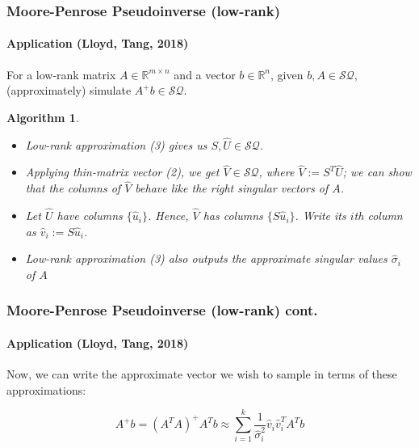 \documentclass{beamer}
\newcommand\0{\mathbf{0}}
\newcommand\RR{\mathbb{R}}
\newcommand\<{\langle}
\renewcommand\>{\rangle}
\newtheorem{algorithm}{Algorithm}[theorem]
\begin{document}
\begin{frame}
\frametitle{Moore-Penrose Pseudoinverse (low-rank)} 	
\framesubtitle{Application (Lloyd, Tang, 2018)}

\begin{problem} For a low-rank matrix $A \in \RR^{m\times n}$
  and a vector $b \in \RR^n$, given $b, A \in \mathcal{SQ}$, (approximately) simulate $A^+b \in \mathcal{SQ}$.
\end{problem}
\pause
\begin{algorithm}   	
\begin{itemize}
\item Low-rank approximation (3) gives us $S,\hat{U} \in \mathcal{SQ}$.

\item Applying thin-matrix vector (2), we get $\hat{V} \in \mathcal{SQ}$, where $\hat{V} := S^T\hat{U}$; we can show that the columns of $\hat{V}$ behave like the right singular vectors of $A$.
\item Let $\hat{U}$ have columns $\{ \hat{u}_i\}$. Hence, $\hat{V}$ has columns $\{ S \hat{u}_i \}$. Write its $i$th column as $\hat{v}_i := S\hat{u}_i$.

\item Low-rank approximation (3) also outputs the approximate singular values $\hat{\sigma}_i$ of $A$
\end{itemize}
\end{algorithm}
\end{frame}

\begin{frame}
\frametitle{Moore-Penrose Pseudoinverse (low-rank) cont.} 	
\framesubtitle{Application (Lloyd, Tang, 2018)}

Now, we can write the approximate vector we wish to sample in terms of these approximations:

$$A^+b = (A^TA)^+A^Tb \approx \sum_{i=1}^k \frac{1}{\hat{\sigma}_i^2}\hat{v}_i\hat{v}_i^T A^Tb$$
\end{frame}
\end{document}
